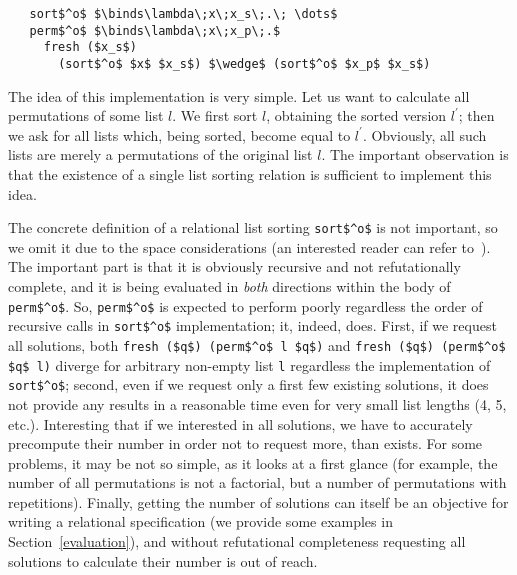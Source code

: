 \begin{lstlisting}
   sort$^o$ $\binds\lambda\;x\;x_s\;.\; \dots$
   perm$^o$ $\binds\lambda\;x\;x_p\;.$
     fresh ($x_s$) 
       (sort$^o$ $x$ $x_s$) $\wedge$ (sort$^o$ $x_p$ $x_s$) 
\end{lstlisting}

The idea of this implementation is very simple. Let us want to calculate all permutations of some list $l$.
We first sort $l$, obtaining the sorted version $l^\prime$; then we ask for all lists which, being sorted,
become equal to $l^\prime$. Obviously, all such lists are merely a permutations of the original list $l$. The
important observation is that the existence of a single list sorting relation is sufficient to implement this
idea.

The concrete definition of a relational list sorting \lstinline|sort$^o$| is not important, so we
omit it due to the space considerations (an interested reader can refer to~\cite{OCanren}). The important part 
is that it is obviously recursive and not refutationally complete, and it is being evaluated 
in \emph{both} directions within the body of \lstinline|perm$^o$|. So, \lstinline|perm$^o$| is expected 
to perform poorly regardless the order of recursive calls in \lstinline|sort$^o$| implementation; it, 
indeed, does. First, if we request all solutions, both \lstinline|fresh ($q$) (perm$^o$ l $q$)| and \lstinline|fresh ($q$) (perm$^o$ $q$ l)| diverge for arbitrary non-empty list \lstinline|l| regardless the implementation of \lstinline|sort$^o$|; second, even if we request only a first few existing solutions, it does not provide any results in a reasonable time even for very small list lengths (4, 5, etc.). Interesting that if we interested in all solutions,
we have to accurately precompute their number in order not to request more, than exists. For some problems,
it may be not so simple, as it looks at a first glance (for example, the number of all permutations is
not a factorial, but a number of permutations with repetitions). Finally, getting the number of solutions can 
itself be an objective for writing a relational specification (we provide some examples in Section~\ref{evaluation}),
and without refutational completeness requesting all solutions to calculate their number is out of
reach.
